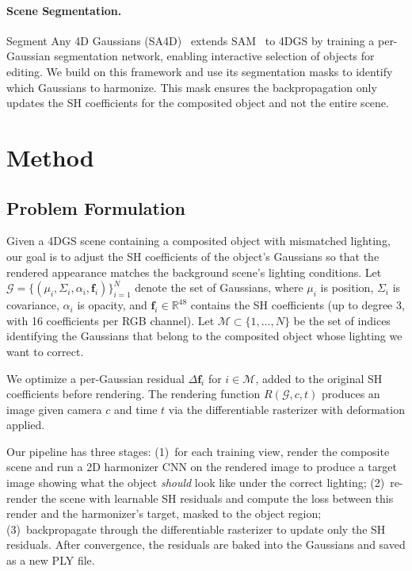 \documentclass[10pt,twocolumn,letterpaper]{article}
\begin{document}
\paragraph{Scene Segmentation.}
Segment Any 4D Gaussians (SA4D)~\cite{ji2024segment4dgaussians} extends SAM~\cite{kirillov2023sam} to 4DGS by training a per-Gaussian segmentation network, enabling interactive selection of objects for editing. We build on this framework and use its segmentation masks to identify which Gaussians to harmonize. This mask ensures the backpropagation only updates the SH coefficients for the composited object and not the entire scene.

\section{Method}

\subsection{Problem Formulation}

Given a 4DGS scene containing a composited object with mismatched lighting, our goal is to adjust the SH coefficients of the object's Gaussians so that the rendered appearance matches the background scene's lighting conditions. Let $\mathcal{G} = \{(\mu_i, \Sigma_i, \alpha_i, \mathbf{f}_i)\}_{i=1}^N$ denote the set of Gaussians, where $\mu_i$ is position, $\Sigma_i$ is covariance, $\alpha_i$ is opacity, and $\mathbf{f}_i \in \mathbb{R}^{48}$ contains the SH coefficients (up to degree 3, with 16 coefficients per RGB channel). Let $\mathcal{M} \subset \{1, \ldots, N\}$ be the set of indices identifying the Gaussians that belong to the composited object whose lighting we want to correct.

We optimize a per-Gaussian residual $\Delta\mathbf{f}_i$ for $i \in \mathcal{M}$, added to the original SH coefficients before rendering. The rendering function $R(\mathcal{G}, c, t)$ produces an image given camera $c$ and time $t$ via the differentiable rasterizer with deformation applied.

Our pipeline has three stages: (1)~for each training view, render the composite scene and run a 2D harmonizer CNN on the rendered image to produce a target image showing what the object \textit{should} look like under the correct lighting; (2)~re-render the scene with learnable SH residuals and compute the loss between this render and the harmonizer's target, masked to the object region; (3)~backpropagate through the differentiable rasterizer to update only the SH residuals. After convergence, the residuals are baked into the Gaussians and saved as a new PLY file.
\end{document}
